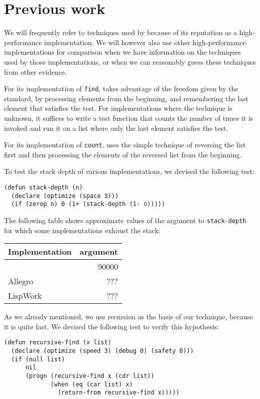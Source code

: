 \section{Previous work}

We will frequently refer to techniques used by \sbcl{} because of its
reputation as a high-performance implementation.  We will however also
use other high-performance implementations for comparison when we have
information on the techniques used by those implementations, or when
we can reasonably guess these techniques from other evidence.

For its implementation of \texttt{find}, \sbcl{} takes advantage of
the freedom given by the standard, by processing elements from the
beginning, and remembering the last element that satisfies the test.
For implementations where the technique is unknown, it suffices to
write a test function that counts the number of times it is invoked
and run it on a list where only the last element satisfies the test.

For its implementation of \texttt{count}, \sbcl{} uses the simple
technique of reversing the list first and then processing the elements
of the reversed list from the beginning.

To test the stack depth of various implementations, we devised the
following test:

{\small\begin{verbatim}
(defun stack-depth (n)
  (declare (optimize (space 3)))
  (if (zerop n) 0 (1+ (stack-depth (1- n)))))
\end{verbatim}}

The following table shows approximate values of the argument to
\texttt{stack-depth} for which some implementations exhaust the stack:

\begin{tabular}{|l|r|}
\hline
Implementation & argument\\
\hline
\hline
\sbcl{} & 90000\\
\hline
Allegro & ???\\
\hline
LispWork & ???\\
\hline
\end{tabular}

As we already mentioned, we use recursion as the basis of our
technique, because it is quite fast.  We devised the following test to
verify this hypothesis:

{\small\begin{verbatim}
(defun recursive-find (x list)
  (declare (optimize (speed 3) (debug 0) (safety 0)))
  (if (null list)
      nil
      (progn (recursive-find x (cdr list))
             (when (eq (car list) x)
               (return-from recursive-find x)))))
\end{verbatim}}


